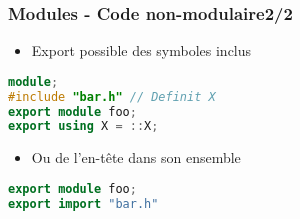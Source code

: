 \documentclass[C++.tex]{subfiles}
\begin{document}
\begin{frame}[fragile]
	\frametitle{Modules - Code non-modulaire\titlehfill{}2/2}
	\begin{itemize}
		\item Export possible des symboles inclus
	\end{itemize}

	\begin{lstlisting}[language=C++]
module;
#include "bar.h" // Definit X
export module foo;
export using X = ::X;\end{lstlisting}

	\begin{itemize}
		\item Ou de l'en-tête dans son ensemble
	\end{itemize}

	\begin{lstlisting}[language=C++]
export module foo;
export import "bar.h"\end{lstlisting}
\end{frame}
\end{document}
